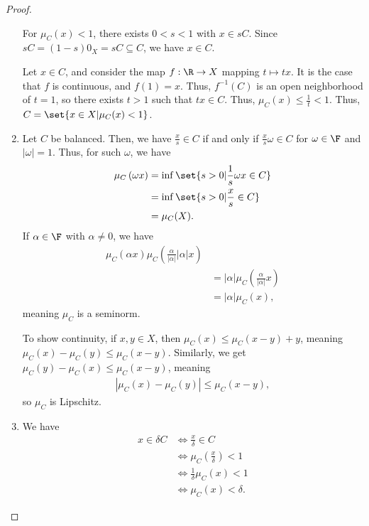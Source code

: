 \documentclass[10pt]{mypackage}
\begin{document}
\begin{proof}
\begin{enumerate}[(1)]
      For $\mu_{C}(x) < 1$, there exists $0 < s < 1$ with $x\in sC$. Since $sC = \left(1-s\right)0_X = sC \subseteq C$, we have $x\in C$.\newline

      Let $x\in C$, and consider the map $f: \R\rightarrow X$ mapping $t\mapsto tx$. It is the case that $f$ is continuous, and $f(1) = x$. Thus, $f^{-1}(C)$ is an open neighborhood of $t=1$, so there exists $t > 1$ such that $tx\in C$. Thus, $\mu_{C}(x) \leq \frac{1}{t} < 1$. Thus, $C = \set{x\in X| \mu_{C}(x) < 1}$.
    \item Let $C$ be balanced. Then, we have $\frac{x}{s}\in C$ if and only if $\frac{x}{s}\omega \in C$ for $\omega \in \F$ and $\left\vert \omega \right\vert = 1$. Thus, for such $\omega$, we have
      \begin{align*}
        \mu_{C}\left(\omega x\right) &= \inf\set{s > 0 | \frac{1}{s}\omega x \in C}\\
                                     &= \inf\set{s > 0 | \frac{x}{s}\in C}\\
                                     &= \mu_{C}(X).
      \end{align*}
      If $\alpha \in \F$ with $\alpha \neq 0$, we have
      \begin{align*}
        \mu_{C}\left(\alpha x\right)  \mu_{C}\left(\frac{\alpha}{\left\vert \alpha \right\vert} \left\vert \alpha \right\vert x\right)\\
        &= \left\vert \alpha \right\vert \mu_{C}\left(\frac{\alpha}{\left\vert \alpha \right\vert} x\right)\\
        &= \left\vert \alpha \right\vert \mu_{C}\left(x\right),
      \end{align*}
      meaning $\mu_{C}$ is a seminorm.\newline

      To show continuity, if $x,y\in X$, then $\mu_{C}(x) \leq \mu_{C}(x-y) + y$, meaning $\mu_{C}\left(x\right) - \mu_{C}\left(y\right) \leq \mu_{C}\left(x-y\right)$. Similarly, we get $\mu_{C}(y) - \mu_{C}(x) \leq \mu_{C}\left(x-y\right)$, meaning
      \begin{align*}
        \left\vert \mu_{C}\left(x\right) - \mu_{C}\left(y\right) \right\vert \leq \mu_{C}\left(x-y\right),
      \end{align*}
      so $\mu_{C}$ is Lipschitz.
    \item We have
      \begin{align*}
        x\in \delta C &\Leftrightarrow \frac{x}{\delta}\in C\\
                      &\Leftrightarrow \mu_{C}\left(\frac{x}{\delta}\right) < 1\\
                      &\Leftrightarrow \frac{1}{\delta}\mu_{C}(x) < 1\\
                      &\Leftrightarrow \mu_{C}\left(x\right) < \delta.
      \end{align*}
  \end{enumerate}
\end{proof}
\end{document}
